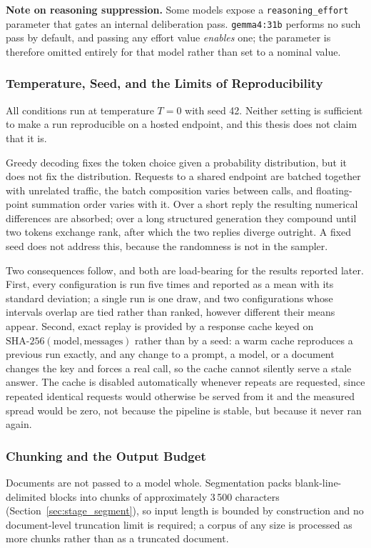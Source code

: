 \documentclass[11pt]{article}
\begin{document}
\textbf{Note on reasoning suppression.} Some models expose a
\texttt{reasoning\_effort} parameter that gates an internal deliberation pass.
\texttt{gemma4:31b} performs no such pass by default, and passing any effort
value \emph{enables} one; the parameter is therefore omitted entirely for that
model rather than set to a nominal value.

\subsubsection{Temperature, Seed, and the Limits of Reproducibility}
\label{sec:determinism}
All conditions run at temperature $T = 0$ with seed 42. Neither setting is
sufficient to make a run reproducible on a hosted endpoint, and this thesis does
not claim that it is.

Greedy decoding fixes the token choice given a probability distribution, but it
does not fix the distribution. Requests to a shared endpoint are batched together
with unrelated traffic, the batch composition varies between calls, and
floating-point summation order varies with it. Over a short reply the resulting
numerical differences are absorbed; over a long structured generation they
compound until two tokens exchange rank, after which the two replies diverge
outright. A fixed seed does not address this, because the randomness is not in
the sampler.

Two consequences follow, and both are load-bearing for the results reported
later. First, every configuration is run five times and reported as a mean with
its standard deviation; a single run is one draw, and two configurations whose
intervals overlap are tied rather than ranked, however different their means
appear. Second, exact replay is provided by a response cache keyed on
$\mathrm{SHA\text{-}256}(\text{model}, \text{messages})$ rather than by a seed:
a warm cache reproduces a previous run exactly, and any change to a prompt, a
model, or a document changes the key and forces a real call, so the cache cannot
silently serve a stale answer. The cache is disabled automatically whenever
repeats are requested, since repeated identical requests would otherwise be
served from it and the measured spread would be zero, not because the pipeline
is stable, but because it never ran again.

\subsubsection{Chunking and the Output Budget}
Documents are not passed to a model whole. Segmentation packs blank-line-delimited
blocks into chunks of approximately 3\,500 characters
(Section~\ref{sec:stage_segment}), so input length is bounded by construction and
no document-level truncation limit is required; a corpus of any size is processed
as more chunks rather than as a truncated document.
\end{document}
